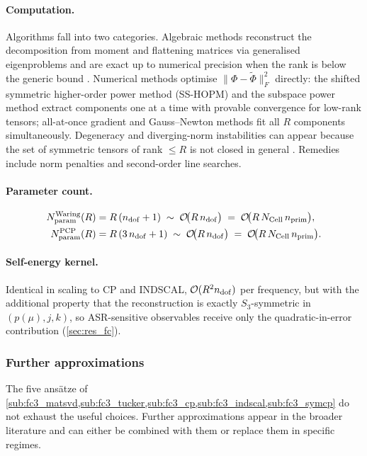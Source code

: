 \paragraph{Computation.} Algorithms fall into two categories. Algebraic methods reconstruct the
decomposition from moment and flattening matrices via generalised eigenproblems and are exact up
to numerical precision when the rank is below the generic bound
\cite{brachat_symmetric_2010, oeding_eigenvectors_2013}. Numerical methods optimise
$\|\Phi-\tilde\Phi\|_F^{2}$ directly: the shifted symmetric higher-order power method (SS-HOPM)
\cite{kolda_shifted_2011} and the subspace power method \cite{kileel_subspace_2025} extract
components one at a time with provable convergence for low-rank tensors; all-at-once gradient
and Gauss--Newton methods \cite{kolda_numerical_2015} fit all $R$ components simultaneously.
Degeneracy and diverging-norm instabilities can appear because the set of symmetric tensors of
rank $\le R$ is not closed in general
\cite{stegeman_degeneracy_2006, de_silva_tensor_2008}. Remedies include norm penalties and
second-order line searches.

\paragraph{Parameter count.}
\begin{align}
  N_{\mathrm{param}}^{\mathrm{Waring}}(R) &= R\,(n_{\mathrm{dof}} + 1)
    \;\sim\; \mathcal{O}\!\bigl(R\,n_{\mathrm{dof}}\bigr)
    \;=\; \mathcal{O}\!\bigl(R\,N_{\mathrm{Cell}}\,n_{\mathrm{prim}}\bigr),
    \label{eq:fc3_waring_params}\\
  N_{\mathrm{param}}^{\mathrm{PCP}}(R) &= R\,(3\,n_{\mathrm{dof}} + 1)
    \;\sim\; \mathcal{O}\!\bigl(R\,n_{\mathrm{dof}}\bigr)
    \;=\; \mathcal{O}\!\bigl(R\,N_{\mathrm{Cell}}\,n_{\mathrm{prim}}\bigr).
    \label{eq:fc3_pcp_params}
\end{align}

\paragraph{Self-energy kernel.} Identical in scaling to CP and INDSCAL, $\mathcal{O}(R^{2}n_{\mathrm{dof}})$ per
frequency, but with the additional property that the reconstruction is exactly $S_3$-symmetric
in $(p(\mu),j,k)$, so ASR-sensitive observables receive only the quadratic-in-error contribution
(\cref{sec:res_fc}).


\subsubsection{Further approximations}
\label{sub:fc3_other}
The five ans\"atze of
\cref{sub:fc3_matsvd,sub:fc3_tucker,sub:fc3_cp,sub:fc3_indscal,sub:fc3_symcp} do not exhaust the
useful choices. Further approximations appear in the broader literature and can either be
combined with them or replace them in specific regimes.

